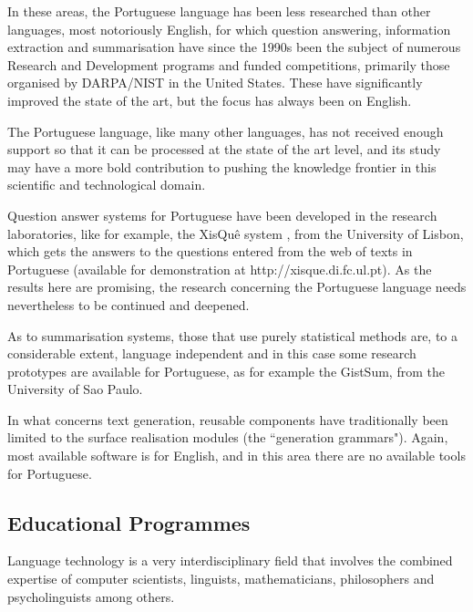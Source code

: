 \begin{multicols}{2}
In these areas, the Portuguese language has been less researched than other languages, most notoriously English, 
for which question answering, information extraction and summarisation have since the 1990s been the subject of numerous 
Research and Development programs and funded competitions, 
primarily those organised by DARPA/NIST in the United States. 
These have significantly improved the state of the art, but the focus has always been on English.

The Portuguese language, like many other languages, has not received enough support
so that it can be processed at the state of the art level, and its study may
have a more bold contribution to pushing the knowledge frontier in this scientific and technological 
domain.


Question answer systems for Portuguese have been developed in the research laboratories,
like for example, the XisQuê system \cite{xisque}, from the University of Lisbon, which gets the answers
to the questions entered from the web of texts in Portuguese (available for demonstration
at http://xisque.di.fc.ul.pt). As the results here are promising, the research
concerning the Portuguese language needs nevertheless to be continued and deepened.

As to summarisation systems, those that use purely statistical methods are, to a considerable extent, language independent 
and in this case some research prototypes are available for Portuguese, as for example the GistSum,
from the University of Sao Paulo.

In what concerns text generation, reusable components have traditionally been limited to the surface realisation 
modules (the “generation grammars"). Again, most available software is for English, and in this area there are 
no available tools for Portuguese. 


\subsection{Educational Programmes}

 Language technology is a very interdisciplinary field that involves the combined expertise of computer scientists, linguists, mathematicians, philosophers
and psycholinguists among others. 


\end{multicols}
